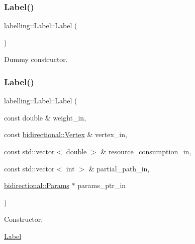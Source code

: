 \subsubsection{\texorpdfstring{Label()}{Label()}\hspace{0.1cm}{\footnotesize\ttfamily [1/3]}}
{\footnotesize\ttfamily labelling\+::\+Label\+::\+Label (\begin{DoxyParamCaption}{ }\end{DoxyParamCaption})\hspace{0.3cm}{\ttfamily [inline]}}



Dummy constructor. 

\mbox{\label{classlabelling_1_1Label_a6861a92f1825ed3bb9ea46515cdf1d16}} 
\subsubsection{\texorpdfstring{Label()}{Label()}\hspace{0.1cm}{\footnotesize\ttfamily [2/3]}}
{\footnotesize\ttfamily labelling\+::\+Label\+::\+Label (\begin{DoxyParamCaption}\item[{const double \&}]{weight\+\_\+in,  }\item[{const \hyperlink{structbidirectional_1_1Vertex}{bidirectional\+::\+Vertex} \&}]{vertex\+\_\+in,  }\item[{const std\+::vector$<$ double $>$ \&}]{resource\+\_\+consumption\+\_\+in,  }\item[{const std\+::vector$<$ int $>$ \&}]{partial\+\_\+path\+\_\+in,  }\item[{\hyperlink{classbidirectional_1_1Params}{bidirectional\+::\+Params} $\ast$}]{params\+\_\+ptr\+\_\+in }\end{DoxyParamCaption})}



Constructor. 

\hyperlink{classlabelling_1_1Label}{Label} \mbox{\label{classlabelling_1_1Label_a255f1384159b9748980f824eb1ddb5f8}} 
